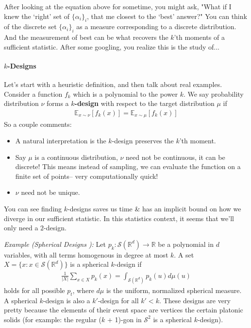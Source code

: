 \documentclass{article}
\begin{document}
After looking at the equation above for sometime, you might ask, "What if I knew the `right' set of $\{\alpha_i\}_i$, that me closest to the `best' answer?" You can think of the discrete set $\{\alpha_i\}_i$ as a measure corresponding to a discrete distribution. And the measurement of best can be what recovers the $k$'th moments of a sufficient statistic. After some googling, you realize this is the study of...

\paragraph{$k$-Designs}
Let's start with a heuristic definition, and then talk about real examples. Consider a function $f_k$ which is a polynomial to the power $k$. We say probability distribution $\nu$ forms a \textbf{$k$-design} with respect to the target distribution $\mu$ if
\begin{align}
	\mathbb E_{x \sim \nu}[f_k(x)] = \mathbb E_{x \sim \mu}[f_k(x)]
\end{align}
So a couple comments:
\begin{itemize}
	\item A natural interpretation is the $k$-design preserves the $k$'th moment.
	\item Say $\mu$ is a continuous distribution, $\nu$ need not be continuous, it can be discrete! This means instead of sampling, we can evaluate the function on a finite set of points-- very computationally quick! 
	\item $\nu$ need not be unique.
\end{itemize}
You can see finding $k$-designs saves us time \& has an implicit bound on how we diverge in our sufficient statistic. In this statistics context, it seems that we'll only need a $2$-design.

\emph{Example (Spherical Designs \cite{colbourn2006handbook, delsarte1977spherical}):} Let $p_k : \mathcal S(\mathbb R^d) \to \mathbb R$ be a polynomial in $d$ variables, with all terms homogenous in degree at most $k$. A set $X = \{x : x \in \mathcal S(\mathbb R^d)\}$ is a spherical $k$-design if 
\begin{align}
	\frac{1}{|X|} \sum_{x \in X}p_k(x) = \int_{\mathcal S(\mathbb R^d)} p_k(u) d\mu(u)
\end{align} holds for all possible $p_t$, where $d\mu$ is the uniform, normalized spherical measure. A spherical $k$-design is also a $k'$-design for all $k' < k$. These designs are very pretty because the elements of their event space are vertices the certain platonic solids (for example: the regular ($k$ + 1)-gon in $\mathcal S^2$ is a spherical $k$-design).
\end{document}
